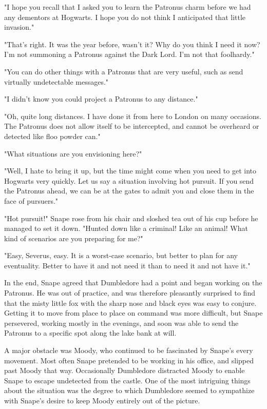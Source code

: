 "I hope you recall that I asked you to learn the Patronus charm before we had any dementors at Hogwarts. I hope you do not think I anticipated that little invasion."

"That's right. It was the year before, wasn't it? Why do you think I need it now? I'm not summoning a Patronus against the Dark Lord. I'm not that foolhardy."

"You can do other things with a Patronus that are very useful, such as send virtually undetectable messages."

"I didn't know you could project a Patronus to any distance."

"Oh, quite long distances. I have done it from here to London on many occasions. The Patronus does not allow itself to be intercepted, and cannot be overheard or detected like floo powder can."

"What situations are you envisioning here?"

"Well, I hate to bring it up, but the time might come when you need to get into Hogwarts very quickly. Let us say a situation involving hot pursuit. If you send the Patronus ahead, we can be at the gates to admit you and close them in the face of pursuers."

"Hot pursuit!" Snape rose from his chair and sloshed tea out of his cup before he managed to set it down. "Hunted down like a criminal! Like an animal! What kind of scenarios are you preparing for me?"

"Easy, Severus, easy. It is a worst-case scenario, but better to plan for any eventuality. Better to have it and not need it than to need it and not have it."

In the end, Snape agreed that Dumbledore had a point and began working on the Patronus. He was out of practice, and was therefore pleasantly surprised to find that the misty little fox with the sharp nose and black eyes was easy to conjure. Getting it to move from place to place on command was more difficult, but Snape persevered, working mostly in the evenings, and soon was able to send the Patronus to a specific spot along the lake bank at will.

A major obstacle was Moody, who continued to be fascinated by Snape's every movement. Most often Snape pretended to be working in his office, and slipped past Moody that way. Occasionally Dumbledore distracted Moody to enable Snape to escape undetected from the castle. One of the most intriguing things about the situation was the degree to which Dumbledore seemed to sympathize with Snape's desire to keep Moody entirely out of the picture.

